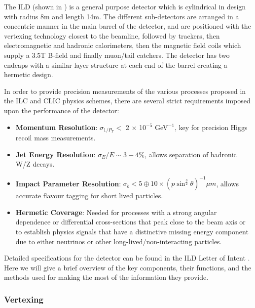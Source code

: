 The ILD (shown in ) is a general purpose detector which is cylindrical in design with radius 8m and length 14m. The different sub-detectors are arranged in a concentric manner in the main barrel of the detector, and are positioned with the vertexing technology closest to the beamline, followed by trackers, then electromagnetic and hadronic calorimeters, then the magnetic field coils which supply a 3.5T B-field and finally muon/tail catchers. The detector has two endcaps with a similar layer structure at each end of the barrel creating a hermetic design.

In order to provide precision measurements of the various processes proposed in the \ac{ILC} and \ac{CLIC} physics schemes, there are several strict requirements imposed upon the performance of the detector:

\begin{itemize}

\item \textbf{Momentum Resolution}: $\sigma_{1/P_T}<$ 2 $\times$ 10$^{-5}$ GeV$^{-1}$, key for precision Higgs recoil mass measurements.

\item \textbf{Jet Energy Resolution}: $\sigma_E/E \sim 3-4\%$, allows separation of hadronic W/Z decays.

\item \textbf{Impact Parameter Resolution}: $\sigma_{b} < 5 \oplus 10 \times (p\sin^{\frac{3}{2}}\theta)^{-1}\mu m$, allows accurate flavour tagging for short lived particles.

\item \textbf{Hermetic Coverage}: Needed for processes with a strong angular dependence or differential cross-sections that peak close to the beam axis or to establish physics signals that have a distinctive missing energy component due to either neutrinos or other long-lived/non-interacting particles.

\end{itemize}

Detailed specifications for the detector can be found in the \ac{ILD} Letter of Intent \cite{ILD}. Here we will give a brief overview of the key components, their functions, and the methods used for making the most of the information they provide.

\subsubsection{Vertexing}

